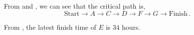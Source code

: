 \begin{subquestions}
\begin{subsubquestions}

\subsubquestion

\begin{subsubsubquestions}

\subsubsubquestion

From  and , we can see that the critical path is,
\begin{equation}
	\text{Start} \rightarrow A \rightarrow C \rightarrow D \rightarrow F \rightarrow G \rightarrow \text{Finish} \,.
\end{equation}	


\subsubsubquestion

From , the latest finish time of $E$ is $34$ hours.

\end{subsubsubquestions}

\end{subsubquestions}

\end{subquestions}

